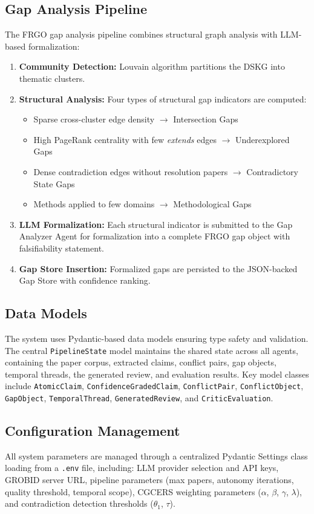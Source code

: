 \subsection{Gap Analysis Pipeline}

The FRGO gap analysis pipeline combines structural graph analysis with LLM-based formalization:

\begin{enumerate}
    \item \textbf{Community Detection:} Louvain algorithm partitions the DSKG into thematic clusters.
    \item \textbf{Structural Analysis:} Four types of structural gap indicators are computed:
    \begin{itemize}
        \item Sparse cross-cluster edge density $\rightarrow$ Intersection Gaps
        \item High PageRank centrality with few \emph{extends} edges $\rightarrow$ Underexplored Gaps
        \item Dense contradiction edges without resolution papers $\rightarrow$ Contradictory State Gaps
        \item Methods applied to few domains $\rightarrow$ Methodological Gaps
    \end{itemize}
    \item \textbf{LLM Formalization:} Each structural indicator is submitted to the Gap Analyzer Agent for formalization into a complete FRGO gap object with falsifiability statement.
    \item \textbf{Gap Store Insertion:} Formalized gaps are persisted to the JSON-backed Gap Store with confidence ranking.
\end{enumerate}

\subsection{Data Models}

The system uses Pydantic-based data models ensuring type safety and validation. The central \texttt{PipelineState} model maintains the shared state across all agents, containing the paper corpus, extracted claims, conflict pairs, gap objects, temporal threads, the generated review, and evaluation results. Key model classes include \texttt{AtomicClaim}, \texttt{ConfidenceGradedClaim}, \texttt{ConflictPair}, \texttt{ConflictObject}, \texttt{GapObject}, \texttt{TemporalThread}, \texttt{GeneratedReview}, and \texttt{CriticEvaluation}.

\subsection{Configuration Management}

All system parameters are managed through a centralized Pydantic Settings class loading from a \texttt{.env} file, including: LLM provider selection and API keys, GROBID server URL, pipeline parameters (max papers, autonomy iterations, quality threshold, temporal scope), CGCERS weighting parameters ($\alpha$, $\beta$, $\gamma$, $\lambda$), and contradiction detection thresholds ($\theta_1$, $\tau$).
